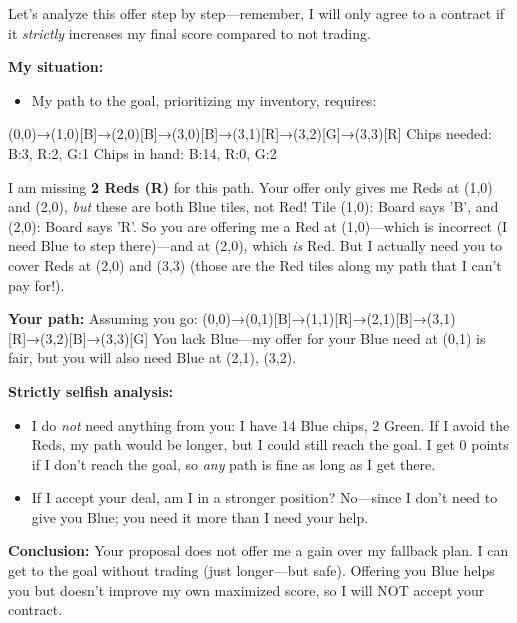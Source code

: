 \documentclass{article} %
\begin{document}
\begin{bluebox}[P-Blue]
Let's analyze this offer step by step—remember, I will only agree to a contract if it \textit{strictly} increases my final score compared to not trading.

\vspace{0.5em}

\textbf{My situation:}
\begin{itemize}
  \item My path to the goal, prioritizing my inventory, requires:
\end{itemize}
  (0,0)→(1,0)[B]→(2,0)[B]→(3,0)[B]→(3,1)[R]→(3,2)[G]→(3,3)[R]  
  Chips needed: B:3, R:2, G:1  
  Chips in hand: B:14, R:0, G:2  

\vspace{0.5em}

I am missing \textbf{2 Reds (R)} for this path.  
Your offer only gives me Reds at (1,0) and (2,0), \textit{but} these are both Blue tiles, not Red!  
Tile (1,0): Board says 'B', and (2,0): Board says 'R'.  
So you are offering me a Red at (1,0)—which is incorrect (I need Blue to step there)—and at (2,0), which \textit{is} Red. But I actually need you to cover Reds at (2,0) and (3,3) (those are the Red tiles along my path that I can't pay for!).

\vspace{0.5em}

\textbf{Your path:}
Assuming you go:
(0,0)→(0,1)[B]→(1,1)[R]→(2,1)[B]→(3,1)[R]→(3,2)[B]→(3,3)[G]  
You lack Blue—my offer for your Blue need at (0,1) is fair, but you will also need Blue at (2,1), (3,2).

\vspace{0.5em}

\textbf{Strictly selfish analysis:}  
\begin{itemize}
  \item I do \textit{not} need anything from you: I have 14 Blue chips, 2 Green. If I avoid the Reds, my path would be longer, but I could still reach the goal. I get 0 points if I don't reach the goal, so \textit{any} path is fine as long as I get there.
  \item If I accept your deal, am I in a stronger position? No—since I don't need to give you Blue; you need it more than I need your help.
\end{itemize}

\vspace{0.5em}

\textbf{Conclusion:}  
Your proposal does not offer me a gain over my fallback plan. I can get to the goal without trading (just longer—but safe). Offering you Blue helps you but doesn't improve my own maximized score, so I will NOT accept your contract.


\end{bluebox}
\end{document}
